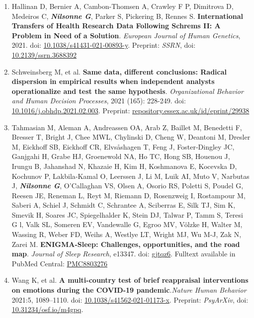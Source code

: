 \documentclass[10pt]{article}
\begin{document}
\begin{enumerate}[nolistsep]
\item Hallinan D, Bernier A, Cambon-Thomsen A, Crawley F P, Dimitrova D, Medeiros C, \textbf{\textit{Nilsonne G}}, Parker S, Pickering B, Rennes S. \textbf{International Transfers of Health Research Data Following Schrems II: A Problem in Need of a Solution}. \emph{European Journal of Human Genetics}, 2021. doi: \href{http://doi.org/10.1038/s41431-021-00893-y}{10.1038/s41431-021-00893-y}. Preprint: \emph{SSRN}, doi: \href{http://doi.org/10.2139/ssrn.3688392}{10.2139/ssrn.3688392}
\item Schweinsberg M, et al. \textbf{Same data, different conclusions: Radical dispersion in empirical results when independent analysts operationalize and test the same hypothesis}. \emph{Organizational Behavior and Human Decision Processes}, 2021 (165): 228-249.  doi: \href{http://doi.org/10.1016/j.obhdp.2021.02.003}{10.1016/j.obhdp.2021.02.003}. Preprint: \href{http://repository.essex.ac.uk/id/eprint/29938}{repository.essex.ac.uk/id/eprint/29938}
\item Tahmasian M, Aleman A, Andreassen OA, Arab Z, Baillet M, Benedetti F, Bresser T, Bright J, Chee MWL, Chylinski D, Cheng W, Deantoni M, Dresler M, Eickhoff SB, Eickhoff CR, Elvsåshagen T, Feng J, Foster‐Dingley JC, Ganjgahi H, Grabe HJ, Groenewold NA, Ho TC, Hong SB, Houenou J, Irungu B, Jahanshad N, Khazaie H, Kim H, Koshmanova E, Kocevska D, Kochunov P, Lakbila‐Kamal O, Leerssen J, Li M, Luik AI, Muto V, Narbutas J, \textbf{\textit{Nilsonne G}}, O’Callaghan VS, Olsen A, Osorio RS, Poletti S, Poudel G, Reesen JE, Reneman L, Reyt M, Riemann D, Rosenzweig I, Rostampour M, Saberi A, Schiel J, Schmidt C, Schrantee A, Sciberras E, Silk TJ, Sim K, Smevik H, Soares JC, Spiegelhalder K, Stein DJ, Talwar P, Tamm S, Teresi G l, Valk SL, Someren EV, Vandewalle G, Egroo MV, Völzke H, Walter M, Wassing R, Weber FD, Weihs A, Westlye LT, Wright MJ, Wu M-J, Zak N, Zarei M. \textbf{ENIGMA-Sleep: Challenges, opportunities, and the road map}. \emph{Journal of Sleep Research}, e13347. doi: \href{http://doi.org/gjtqz6}{gjtqz6}. Fulltext available in PubMed Central: \href{https://www.ncbi.nlm.nih.gov/pmc/articles/PMC8803276/}{PMC8803276}
\item Wang K, et al. \textbf{A multi-country test of brief reappraisal interventions on emotions during the COVID-19 pandemic}.\emph{Nature Human Behavior} 2021:5, 1089–1110. doi: \href{https://doi.org/10.1038/s41562-021-01173-x}{10.1038/s41562-021-01173-x}. Preprint: \emph{PsyArXiv}, doi: \href{https://doi.org/10.31234/osf.io/m4gpq}{10.31234/osf.io/m4gpq}.

\end{enumerate}
\end{document}

